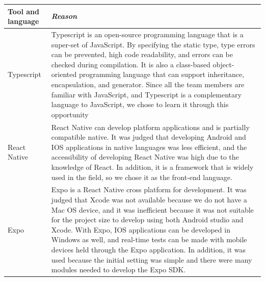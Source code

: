 \documentclass[conference]{IEEEtran}
\begin{document}
\begin{table}[!htbp]\normalsize
\begin{center}
\begin{tabular}{|p{1.4cm}|p{6.2cm}|}
\hline
\textbf{Tool and language} & \textbf{\textit{Reason}}\\
\hline
Typescript & Typescript is an open-source programming language that is a super-set of JavaScript. By specifying the static type, type errors can be prevented, high code readability, and errors can be checked during compilation. It is also a class-based object-oriented programming language that can support inheritance, encapsulation, and generator. Since all the team members are familiar with JavaScript, and Typescript is a complementary language to JavaScript, we chose to learn it through this opportunity 
\\ \hline
React Native & React Native can develop platform applications and is partially compatible native. It was judged that developing Android and IOS applications in native languages was less efficient, and the accessibility of developing React Native was high due to the knowledge of React. In addition, it is a framework that is widely used in the field, so we chose it as the front-end language.
\\ \hline
Expo & Expo is a React Native cross platform for development. It was judged that Xcode was not available because we do not have a Mac OS device, and it was inefficient because it was not suitable for the project size to develop using both Android studio and Xcode. With Expo, IOS applications can be developed in Windows as well, and real-time tests can be made with mobile devices held through the Expo application. In addition, it was used because the initial setting was simple and there were many modules needed to develop the Expo SDK.
\\ \hline
\end{tabular}
\label{tab1}
\end{center}
\end{table}
\newpage
\end{document}
